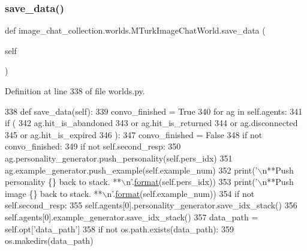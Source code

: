\subsubsection{\texorpdfstring{save\+\_\+data()}{save\_data()}}
{\footnotesize\ttfamily def image\+\_\+chat\+\_\+collection.\+worlds.\+M\+Turk\+Image\+Chat\+World.\+save\+\_\+data (\begin{DoxyParamCaption}\item[{}]{self }\end{DoxyParamCaption})}



Definition at line 338 of file worlds.\+py.


\begin{DoxyCode}
338     \textcolor{keyword}{def }save\_data(self):
339         convo\_finished = \textcolor{keyword}{True}
340         \textcolor{keywordflow}{for} ag \textcolor{keywordflow}{in} self.agents:
341             \textcolor{keywordflow}{if} (
342                 ag.hit\_is\_abandoned
343                 \textcolor{keywordflow}{or} ag.hit\_is\_returned
344                 \textcolor{keywordflow}{or} ag.disconnected
345                 \textcolor{keywordflow}{or} ag.hit\_is\_expired
346             ):
347                 convo\_finished = \textcolor{keyword}{False}
348         \textcolor{keywordflow}{if} \textcolor{keywordflow}{not} convo\_finished:
349             \textcolor{keywordflow}{if} \textcolor{keywordflow}{not} self.second\_resp:
350                 ag.personality\_generator.push\_personality(self.pers\_idx)
351             ag.example\_generator.push\_example(self.example\_num)
352             print(\textcolor{stringliteral}{'\(\backslash\)n**Push personality \{\} back to stack. **\(\backslash\)n'}.\hyperlink{namespaceparlai_1_1chat__service_1_1services_1_1messenger_1_1shared__utils_a32e2e2022b824fbaf80c747160b52a76}{format}(self.pers\_idx))
353             print(\textcolor{stringliteral}{'\(\backslash\)n**Push image \{\} back to stack. **\(\backslash\)n'}.\hyperlink{namespaceparlai_1_1chat__service_1_1services_1_1messenger_1_1shared__utils_a32e2e2022b824fbaf80c747160b52a76}{format}(self.example\_num))
354         \textcolor{keywordflow}{if} \textcolor{keywordflow}{not} self.second\_resp:
355             self.agents[0].personality\_generator.save\_idx\_stack()
356         self.agents[0].example\_generator.save\_idx\_stack()
357         data\_path = self.opt[\textcolor{stringliteral}{'data\_path'}]
358         \textcolor{keywordflow}{if} \textcolor{keywordflow}{not} os.path.exists(data\_path):
359             os.makedirs(data\_path)

\end{DoxyCode}
